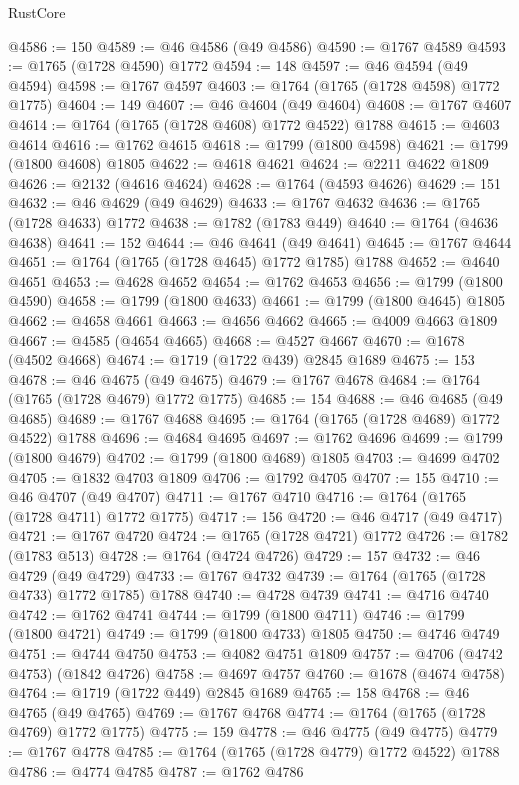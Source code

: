 \begin{lexlean}{RustCore}
\begin{coremodule}
@4586 := 150
@4589 := @46 @4586 (@49 @4586)
@4590 := @1767 @4589
@4593 := @1765 (@1728 @4590) @1772
@4594 := 148
@4597 := @46 @4594 (@49 @4594)
@4598 := @1767 @4597
@4603 := @1764 (@1765 (@1728 @4598) @1772 @1775)
@4604 := 149
@4607 := @46 @4604 (@49 @4604)
@4608 := @1767 @4607
@4614 := @1764 (@1765 (@1728 @4608) @1772 @4522) @1788
@4615 := @4603 @4614
@4616 := @1762 @4615
@4618 := @1799 (@1800 @4598)
@4621 := @1799 (@1800 @4608) @1805
@4622 := @4618 @4621
@4624 := @2211 @4622 @1809
@4626 := @2132 (@4616 @4624)
@4628 := @1764 (@4593 @4626)
@4629 := 151
@4632 := @46 @4629 (@49 @4629)
@4633 := @1767 @4632
@4636 := @1765 (@1728 @4633) @1772
@4638 := @1782 (@1783 @449)
@4640 := @1764 (@4636 @4638)
@4641 := 152
@4644 := @46 @4641 (@49 @4641)
@4645 := @1767 @4644
@4651 := @1764 (@1765 (@1728 @4645) @1772 @1785) @1788
@4652 := @4640 @4651
@4653 := @4628 @4652
@4654 := @1762 @4653
@4656 := @1799 (@1800 @4590)
@4658 := @1799 (@1800 @4633)
@4661 := @1799 (@1800 @4645) @1805
@4662 := @4658 @4661
@4663 := @4656 @4662
@4665 := @4009 @4663 @1809
@4667 := @4585 (@4654 @4665)
@4668 := @4527 @4667
@4670 := @1678 (@4502 @4668)
@4674 := @1719 (@1722 @439) @2845 @1689
@4675 := 153
@4678 := @46 @4675 (@49 @4675)
@4679 := @1767 @4678
@4684 := @1764 (@1765 (@1728 @4679) @1772 @1775)
@4685 := 154
@4688 := @46 @4685 (@49 @4685)
@4689 := @1767 @4688
@4695 := @1764 (@1765 (@1728 @4689) @1772 @4522) @1788
@4696 := @4684 @4695
@4697 := @1762 @4696
@4699 := @1799 (@1800 @4679)
@4702 := @1799 (@1800 @4689) @1805
@4703 := @4699 @4702
@4705 := @1832 @4703 @1809
@4706 := @1792 @4705
@4707 := 155
@4710 := @46 @4707 (@49 @4707)
@4711 := @1767 @4710
@4716 := @1764 (@1765 (@1728 @4711) @1772 @1775)
@4717 := 156
@4720 := @46 @4717 (@49 @4717)
@4721 := @1767 @4720
@4724 := @1765 (@1728 @4721) @1772
@4726 := @1782 (@1783 @513)
@4728 := @1764 (@4724 @4726)
@4729 := 157
@4732 := @46 @4729 (@49 @4729)
@4733 := @1767 @4732
@4739 := @1764 (@1765 (@1728 @4733) @1772 @1785) @1788
@4740 := @4728 @4739
@4741 := @4716 @4740
@4742 := @1762 @4741
@4744 := @1799 (@1800 @4711)
@4746 := @1799 (@1800 @4721)
@4749 := @1799 (@1800 @4733) @1805
@4750 := @4746 @4749
@4751 := @4744 @4750
@4753 := @4082 @4751 @1809
@4757 := @4706 (@4742 @4753) (@1842 @4726)
@4758 := @4697 @4757
@4760 := @1678 (@4674 @4758)
@4764 := @1719 (@1722 @449) @2845 @1689
@4765 := 158
@4768 := @46 @4765 (@49 @4765)
@4769 := @1767 @4768
@4774 := @1764 (@1765 (@1728 @4769) @1772 @1775)
@4775 := 159
@4778 := @46 @4775 (@49 @4775)
@4779 := @1767 @4778
@4785 := @1764 (@1765 (@1728 @4779) @1772 @4522) @1788
@4786 := @4774 @4785
@4787 := @1762 @4786

\end{coremodule}
\end{lexlean}
